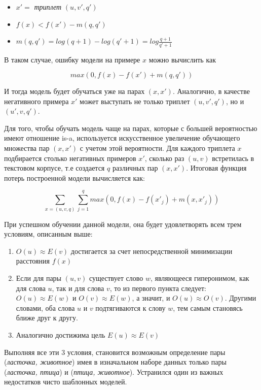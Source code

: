 \begin{itemize}
\item $x' =$ \textit{триплет} $(u, v', q')$

\item $f(x) < f(x') - m(q, q')$

\item $m(q, q') = log(q + 1) - log(q' + 1) = log \frac{q + 1}{q' + 1}$
\end{itemize}


В таком случае, ошибку модели на примере $x$ можно вычислить как

$$max(0, f(x) - f(x') + m(q, q') )$$

И тогда модель будет обучаться уже на парах $(x, x')$.
Аналогично, в качестве негативного примера $x'$ может выступать не только триплет
$(u, v', q')$, но и $(u', v, q')$.

Для того, чтобы обучать модель чаще на парах, которые с большей вероятностью
имеют отношение is-a, используется искусственное увеличение обучающего
множества пар $(x, x')$ с учетом этой вероятности. Для каждого триплета $x$
подбирается столько негативных примеров $x'$, сколько раз $(u, v)$ встретилась в
текстовом корпусе, т.е создается $q$ различных пар $(x, x')$.
Итоговая функция потерь построенной модели вычисляется как:

$$\sum_{x = (u, v, q)} \sum_{j = 1}^{q} max(0, f(x) - f(x'_j) + m(x, x'_j))$$

При успешном обучении данной модели, она будет удовлетворять всем трем
условиям, описанным выше:

\begin{enumerate}
\item $O(u) \approx E(v)$ достигается за счет непосредственной минимизации расстояния $f(x)$
\item Если для пары $(u, v)$ существует слово $w$, являющееся гиперонимом, как для
слова $u$, так и для слова $v$, то из первого пункта следует: $O(u) \approx E(w)$ и $O(v) \approx E(w)$, а значит, и $O(u) \approx O(v)$. Другими словами, оба слова $u$ и $v$ подтягиваются к
слову $w$, тем самым становясь ближе друг к другу.
\item Аналогично достижима цель $E(u) \approx E(v)$
\end{enumerate}

Выполняя все эти 3 условия, становится возможным определение пары (\textit{ласточка,
животное}) имея в изначальном наборе данных только пары (\textit{ласточка, птица}) и
(\textit{птица, животное}). Устранился один из важных недостатков чисто шаблонных
моделей.

